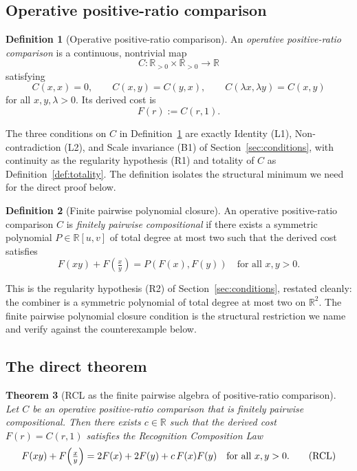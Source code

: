 \documentclass[11pt,a4paper]{article}
\newtheorem{theorem}{Theorem}
\theoremstyle{definition}
\newtheorem{definition}[theorem]{Definition}
\theoremstyle{remark}
\begin{document}
\subsection{Operative positive-ratio comparison}

\begin{definition}[Operative positive-ratio comparison]
\label{def:operative-comparison}
An \emph{operative positive-ratio comparison} is a continuous,
nontrivial map
\[
C : \mathbb{R}_{>0} \times \mathbb{R}_{>0} \to \mathbb{R}
\]
satisfying
\[
C(x, x) = 0, \qquad C(x, y) = C(y, x), \qquad
C(\lambda x, \lambda y) = C(x, y)
\]
for all $x, y, \lambda > 0$. Its derived cost is
\[
F(r) := C(r, 1).
\]
\end{definition}

The three conditions on $C$ in Definition~\ref{def:operative-comparison}
are exactly Identity (L1), Non-contradiction (L2), and Scale invariance
(B1) of Section~\ref{sec:conditions}, with continuity as the
regularity hypothesis (R1) and totality of $C$ as Definition~\ref{def:totality}.
The definition isolates the structural minimum we need for the direct
proof below.

\begin{definition}[Finite pairwise polynomial closure]
\label{def:finite-pairwise-closure}
An operative positive-ratio comparison $C$ is \emph{finitely pairwise
compositional} if there exists a symmetric polynomial $P \in
\mathbb{R}[u, v]$ of total degree at most two such that the derived cost
satisfies
\[
F(xy) + F\!\left(\tfrac{x}{y}\right) = P(F(x), F(y))
\quad \text{for all } x, y > 0.
\]
\end{definition}

This is the regularity hypothesis (R2) of Section~\ref{sec:conditions},
restated cleanly: the combiner is a symmetric polynomial of total degree
at most two on $\mathbb{R}^2$. The finite pairwise polynomial closure
condition is the structural restriction we name and verify against the
counterexample below.

\subsection{The direct theorem}

\begin{theorem}[RCL as the finite pairwise algebra of positive-ratio comparison]
\label{thm:rcl-direct}
Let $C$ be an operative positive-ratio comparison that is finitely
pairwise compositional. Then there exists $c \in \mathbb{R}$ such that
the derived cost $F(r) = C(r, 1)$ satisfies the Recognition Composition
Law
\[
F(xy) + F\!\left(\tfrac{x}{y}\right) = 2F(x) + 2F(y) + c\,F(x) F(y)
\quad \text{for all } x, y > 0. \tag{$\mathrm{RCL}$}
\]
\end{theorem}
\end{document}
